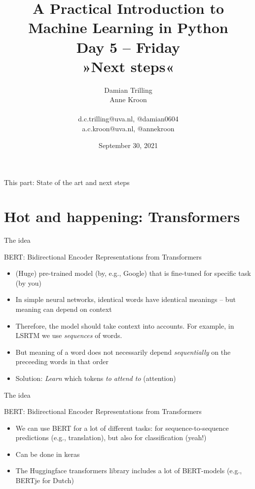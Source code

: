 \documentclass[compress]{beamer}
\title[ML in PYthon]{\textbf{A Practical Introduction to Machine Learning in Python} \\Day 5 -- Friday \\ »Next steps«}
\author[Damian Trilling, Anne Kroon]{Damian Trilling \\ Anne Kroon \\ ~ \\ \footnotesize{d.c.trilling@uva.nl, @damian0604 \\a.c.kroon@uva.nl, @annekroon} \\}
\date{September 30, 2021}
\institute[Gesis]{Gesis}
\begin{document}
\begin{frame}{}
	\titlepage
\end{frame}

\begin{frame}{This part: State of the art and next steps}
	\tableofcontents
\end{frame}




\section{Hot and happening: Transformers}

\begin{frame}{The idea}
\begin{block}{BERT: Bidirectional Encoder Representations from Transformers 	\parencite{BERT}}
	\begin{itemize}[<+->]
		\item (Huge) pre-trained model (by, e.g., Google) that is fine-tuned for specific task (by you)
		\item In simple neural networks, identical words have identical meanings -- but meaning can depend on context
		\item Therefore, the model should take context into accounts. For example, in LSRTM we use \emph{sequences} of words.
		\item But meaning of a word does not necessarily depend \emph{sequentially} on the preceeding words in that order
		\item Solution: \textit{Learn} which tokens \emph{to attend to} (attention)
	\end{itemize}
\end{block}
\end{frame}

\begin{frame}{The idea}
	\begin{block}{BERT: Bidirectional Encoder Representations from Transformers \parencite{BERT}}
		\begin{itemize}[<+->]
			\item We can use BERT for a lot of different tasks: for sequence-to-sequence predictions (e.g., translation), but also for classification (yeah!)
			\item Can be done in keras
			\item The Huggingface transformers library includes a lot of BERT-models (e.g., BERTje for Dutch)
		\end{itemize}
	\end{block}
\end{frame}
\end{document}
